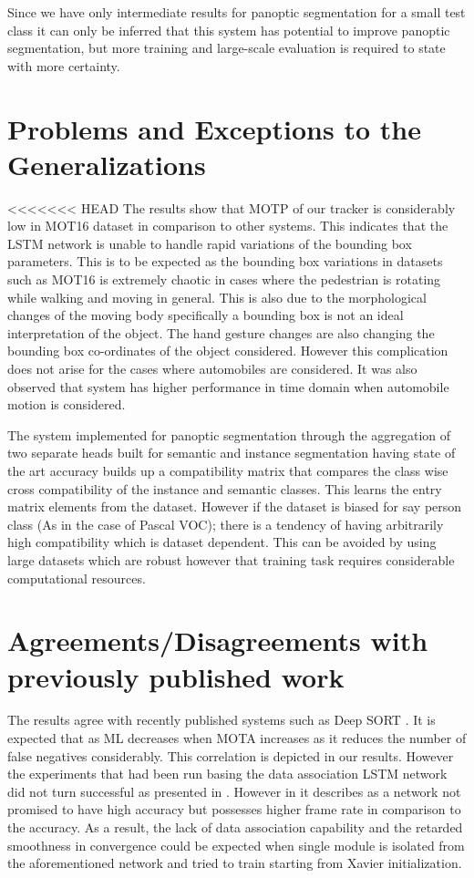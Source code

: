 Since we have only intermediate results for panoptic segmentation for a small test class it can only be inferred that this system has potential to improve panoptic segmentation, but more training and large-scale evaluation is required to state with more certainty.

\section{Problems and Exceptions to the Generalizations}
<<<<<<< HEAD
The results show that MOTP of our tracker is considerably low in MOT16 dataset in comparison to other systems. This indicates that the LSTM network is unable to handle rapid variations of the bounding box parameters. This is to be expected as the bounding box variations in datasets such as MOT16 is extremely chaotic in cases where the pedestrian is rotating while walking and moving in general. This is also due to the morphological changes of the moving body specifically a bounding box is not an ideal interpretation of the object. The hand gesture changes are also changing the bounding box co-ordinates of the object considered. However this complication does not arise for the cases where automobiles are considered. It was also observed that system has higher performance in time domain when automobile motion is considered.

The system implemented for panoptic segmentation through the aggregation of two separate heads built for semantic and instance segmentation having state of the art accuracy builds up a compatibility matrix that compares the class wise cross compatibility of the instance and semantic classes. This learns the entry matrix elements from the dataset. However if the dataset is biased for say person class (As in the case of Pascal VOC); there is a tendency of having arbitrarily high compatibility which is dataset dependent. This can be avoided by using large datasets which are robust however that training task requires considerable computational resources. 


\section{Agreements/Disagreements with previously published work}
The results agree with recently published systems such as Deep SORT \cite{DeepSiam:deepSort}. It is expected that as ML decreases when MOTA increases as it reduces the number of false negatives considerably. This correlation is depicted in our results.
However the experiments that had been run basing the data association LSTM network did not turn successful as presented in \cite{DeepSiam:MilanL0RS16}. However in \cite{DeepSiam:MilanL0RS16} it describes as a network not promised to have high accuracy but possesses higher frame rate in comparison to the accuracy. As a result, the lack of data association capability and the retarded smoothness in convergence could be expected when single module is isolated from the aforementioned network and tried to train starting from Xavier initialization.

